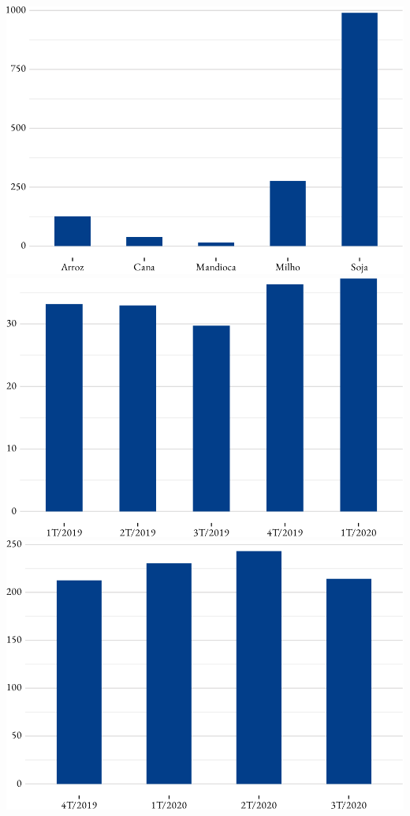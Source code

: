 \includegraphics{fig/area_plantada-1.pdf}
\includegraphics{fig/prod_leite-1.pdf}
\includegraphics{fig/abate_total-1.pdf}

